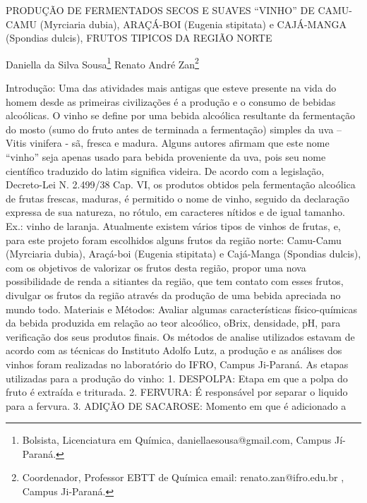 \documentclass[article,12pt,onesidea,4paper,english,brazil]{abntex2}
\begin{document}
	
	
	\frenchspacing 
	
	\begin{center}
		\LARGE PRODUÇÃO DE FERMENTADOS SECOS E SUAVES “VINHO” DE CAMU-CAMU
		(Myrciaria dubia), ARAÇÁ-BOI (Eugenia stipitata) e CAJÁ-MANGA (Spondias dulcis), FRUTOS TIPICOS DA REGIÃO NORTE
		
		\normalsize
		Daniella da Silva Sousa\footnote{Bolsista, Licenciatura em Química, daniellaesousa@gmail.com, Campus Jí-Paraná.} 
		Renato André Zan\footnote{Coordenador, Professor EBTT de Química email: renato.zan@ifro.edu.br , Campus Ji-Paraná.} 
	\end{center}
	
	\noindent Introdução: Uma das atividades mais antigas que esteve presente na vida do
	homem desde as primeiras civilizações é a produção e o consumo de bebidas
	alcoólicas. O vinho se define por uma bebida alcoólica resultante da fermentação do
	mosto (sumo do fruto antes de terminada a fermentação) simples da uva – Vitis
	vinifera - sã, fresca e madura. Alguns autores afirmam que este nome “vinho” seja
	apenas usado para bebida proveniente da uva, pois seu nome científico traduzido do
	latim significa videira. De acordo com a legislação, Decreto-Lei N. 2.499/38 Cap. VI,
	os produtos obtidos pela fermentação alcoólica de frutas frescas, maduras, é
	permitido o nome de vinho, seguido da declaração expressa de sua natureza, no
	rótulo, em caracteres nítidos e de igual tamanho. Ex.: vinho de laranja. Atualmente
	existem vários tipos de vinhos de frutas, e, para este projeto foram escolhidos alguns
	frutos da região norte: Camu-Camu (Myrciaria dubia), Araçá-boi (Eugenia stipitata) e
	Cajá-Manga (Spondias dulcis), com os objetivos de valorizar os frutos desta região,
	propor uma nova possibilidade de renda a sitiantes da região, que tem contato com
	esses frutos, divulgar os frutos da região através da produção de uma bebida
	apreciada no mundo todo. Materiais e Métodos: Avaliar algumas características
	físico-químicas da bebida produzida em relação ao teor alcoólico, oBrix, densidade,
	pH, para verificação dos seus produtos finais. Os métodos de analise utilizados
	estavam de acordo com as técnicas do Instituto Adolfo Lutz, a produção e as
	análises dos vinhos foram realizadas no laboratório do IFRO, Campus Ji-Paraná. As
	etapas utilizadas para a produção do vinho: 1. DESPOLPA: Etapa em que a polpa
	do fruto é extraída e triturada. 2. FERVURA: É responsável por separar o liquido
	para a fervura. 3. ADIÇÃO DE SACAROSE: Momento em que é adicionado a
\end{document}
